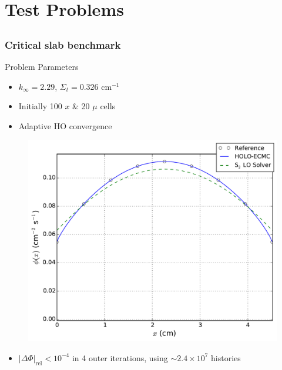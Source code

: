 \documentclass[xcolor=dvipsnames]{beamer}
\newcommand{\coly}[1]{{\color{yellow} #1}}
\newlength{\wideitemsep}
\let\olditem\item
\renewcommand{\item}{\setlength{\itemsep}{\wideitemsep}\olditem}
\begin{document}
\section{Test Problems}
\subsection{}
\begin{frame}
    \frametitle{\coly{Critical slab benchmark}}
    \fontsize{9}{5.0}\selectfont
    \begin{block}{Problem Parameters}
    \begin{itemize}
        \item $k_\infty = 2.29$, $\Sigma_t = 0.326$ cm$^{-1}$
        \item Initially 100 $x$ \& 20 $\mu$ cells
        \item Adaptive HO convergence
    \end{itemize}
    \pause
    \end{block}
    \begin{minipage}{0.49\textwidth}
    \begin{figure}
    \centering
    \includegraphics[width=1.09\textwidth]{sood_fiss_src.pdf}
    \end{figure}
    \end{minipage}
    \begin{minipage}{0.49\textwidth}
    \begin{itemize}
        \item $|\Delta \Phi|_{\text{rel}} < 10^{-4}$ in 4 outer iterations, using            $\sim2.4\times10^7$ histories

\end{itemize}
\end{minipage}
\end{frame}
\end{document}
